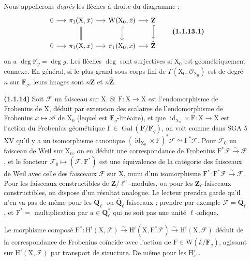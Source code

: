 \documentclass[11pt,leqno]{article}
\newcommand{\Page}[1]{\ifvmode\noindent\else\unskip\ \fi{\footnotesize\textcolor{gray}{[p.\,#1]}}\ \ignorespaces}
\begin{document}
\Page{153}

Nous appellerons \textit{degrés} les flèches à droite du diagramme :
\[
\begin{tikzcd}[column sep=1.4em,row sep=1.8em]
0 \arrow[r]
  & \pi_1(\mathrm{X},\bar{x}) \arrow[r] \arrow[d,equal]
  & \mathrm{W}(\mathrm{X}_0,\bar{x}) \arrow[r] \arrow[d,hook]
  & \mathbf{Z} \arrow[d,hook] \\
0 \arrow[r]
  & \pi_1(\mathrm{X},\bar{x}) \arrow[r]
  & \pi_1(\mathrm{X}_0,\bar{x}) \arrow[r]
  & \widehat{\mathbf{Z}}
\end{tikzcd}
\tag*{\textbf{(1.1.13.1)}}
\]
on a \(\deg \mathrm{F}_y=\deg y\). Les flèches \(\deg\) sont surjectives si \(\mathrm{X}_0\) est géométriquement connexe. En général, si le plus grand sous-corps fini de \(\Gamma(\mathrm{X}_0,\mathscr{O}_{\mathrm{X}_0})\) est de degré \(n\) sur \(\mathbf{F}_q\), leurs images sont \(n\mathbf{Z}\) et \(n\widehat{\mathbf{Z}}\).

\textbf{(1.1.14)} Soit \(\mathscr{F}\) un faisceau sur \(\mathrm{X}\). Si \(\mathrm{F}:\mathrm{X}\to\mathrm{X}\) est l’endomorphisme de Frobenius de \(\mathrm{X}\), déduit par extension des scalaires de l’endomorphisme de Frobenius \(x\mapsto x^q\) de \(\mathrm{X}_0\) (lequel est \(\mathbf{F}_q\)-linéaire), et que \(\operatorname{id}_{\mathrm{X}_0}\times\mathrm{F}:\mathrm{X}\to\mathrm{X}\) est l’action du Frobenius géométrique \(\mathrm{F}\in\operatorname{Gal}(\mathbf{F}/\mathbf{F}_q)\), on voit comme dans SGA 5 XV qu’il y a un isomorphisme canonique \((\operatorname{id}_{\mathrm{X}_0}\times\mathrm{F})^*\mathscr{F}\simeq\mathrm{F}^*\mathscr{F}\). Pour \(\mathscr{F}_0\) un faisceau de Weil sur \(\mathrm{X}_0\), on en déduit une correspondance de Frobenius \(\mathrm{F}^*\mathscr{F}\xrightarrow{\sim}\mathscr{F}\), et le foncteur \(\mathscr{F}_0\mapsto(\mathscr{F},\mathrm{F}^*)\) est une équivalence de la catégorie des faisceaux de Weil avec celle des faisceaux \(\mathscr{F}\) sur \(\mathrm{X}\), muni d’un isomorphisme \(\mathrm{F}^*:\mathrm{F}^*\mathscr{F}\xrightarrow{\sim}\mathscr{F}\). Pour les faisceaux constructibles de \(\mathbf{Z}/\ell^n\)-modules, ou pour les \(\mathbf{Z}_\ell\)-faisceaux constructibles, on dispose d’un résultat analogue. Le lecteur prendra garde qu’il n’en va pas de même pour les \(\mathbf{Q}_\ell\)- ou \(\overline{\mathbf{Q}}_\ell\)-faisceaux : prendre par exemple \(\mathscr{F}=\mathbf{Q}_\ell\), et \(\mathrm{F}^*=\) multiplication par \(u\in\mathbf{Q}_\ell^*\) qui ne soit pas une unité \(\ell\)-adique.

Le morphisme composé \(\mathrm{F}^*:\mathrm{H}^i(\mathrm{X},\mathscr{F})\xrightarrow{\sim}\mathrm{H}^i(\mathrm{X},\mathrm{F}^*\mathscr{F})\xrightarrow{\sim}\mathrm{H}^i(\mathrm{X},\mathscr{F})\) déduit de la correspondance de Frobenius coïncide avec l’action de \(\mathrm{F}\in\mathrm{W}(\bar{k}/\mathbf{F}_q)\), agissant sur \(\mathrm{H}^i(\mathrm{X},\mathscr{F})\) par transport de structure. De même pour les \(\mathrm{H}_c^i\)\ldots
\end{document}
